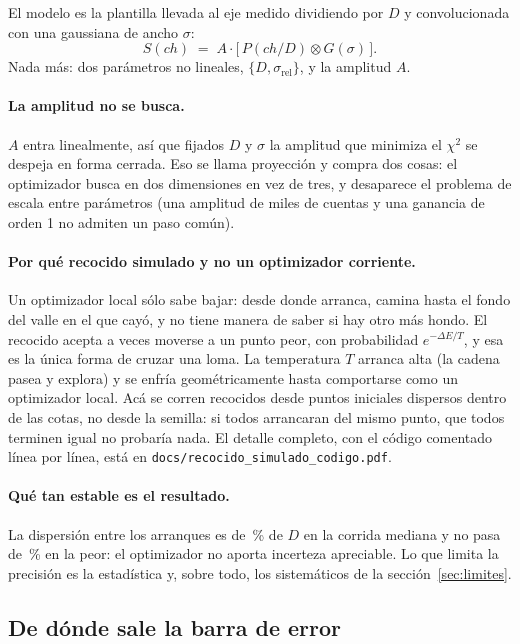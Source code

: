 \documentclass[11pt,a4paper]{article}
\begin{document}
El modelo es la plantilla llevada al eje medido dividiendo por $D$ y
convolucionada con una gaussiana de ancho $\sigma$:
\[
   S(ch) \;=\; A \cdot \big[\,P(ch/D) \otimes G(\sigma)\,\big].
\]
Nada más: dos parámetros no lineales, $\{D, \sigma_{\text{rel}}\}$, y la
amplitud $A$.

\paragraph{La amplitud no se busca.} $A$ entra linealmente, así que fijados $D$
y $\sigma$ la amplitud que minimiza el $\chi^2$ se despeja en forma cerrada.
Eso se llama proyección y compra dos cosas: el optimizador busca en dos
dimensiones en vez de tres, y desaparece el problema de escala entre
parámetros (una amplitud de miles de cuentas y una ganancia de orden 1 no
admiten un paso común).

\paragraph{Por qué recocido simulado y no un optimizador corriente.} Un
optimizador local sólo sabe bajar: desde donde arranca, camina hasta el fondo
del valle en el que cayó, y no tiene manera de saber si hay otro más hondo. El
recocido acepta a veces moverse a un punto peor, con probabilidad
$e^{-\Delta E/T}$, y esa es la única forma de cruzar una loma. La temperatura
$T$ arranca alta (la cadena pasea y explora) y se enfría geométricamente hasta
comportarse como un optimizador local. Acá se corren \NArranques{} recocidos
desde puntos iniciales dispersos dentro de las cotas, no desde la semilla: si
todos arrancaran del mismo punto, que todos terminen igual no probaría nada.
El detalle completo, con el código comentado línea por línea, está en
\texttt{docs/recocido\_simulado\_codigo.pdf}.

\paragraph{Qué tan estable es el resultado.} La dispersión entre los
\NArranques{} arranques es de \DispersionMediana\,\% de $D$ en la corrida
mediana y no pasa de \DispersionMax\,\% en la peor: el optimizador no aporta
incerteza apreciable. Lo que limita la precisión es la estadística y, sobre
todo, los sistemáticos de la sección~\ref{sec:limites}.

\subsection{De dónde sale la barra de error}
\end{document}
